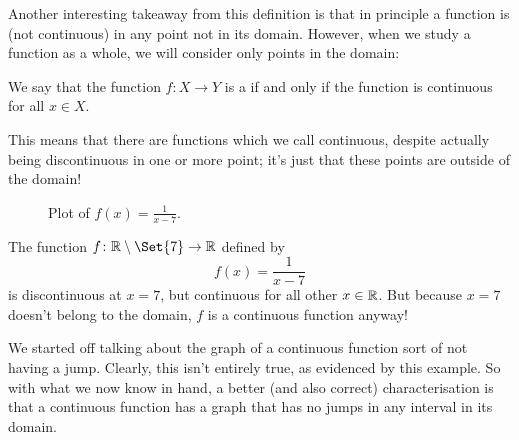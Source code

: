 \noindent
Another interesting takeaway from this definition is that in principle a function is  (not continuous) in any point not in its domain. However, when we study a function as a whole, we will consider only points in the domain:

\begin{definition}
	We say that the function $f \colon X \to Y$ is a  if and only if the function is continuous for all $x \in X$.
\end{definition}

\noindent
This means that there are functions which we call continuous, despite actually being discontinuous in one or more point; it's just that these points are outside of the domain!

\begin{figure}
	\centering
	\caption{Plot of $\displaystyle f(x) = \frac{1}{x - 7}$.}
\end{figure}

\begin{example}
	The function $f \colon \R \setminus \Set{7} \to \R$ defined by
	\[
		f(x) = \frac{1}{x - 7}
	\]
	is discontinuous at $x = 7$, but continuous for all other $x \in \mathbb{R}$.
	But because $x = 7$ doesn't belong to the domain, $f$ is a continuous function anyway!
\end{example}

\noindent
We started off talking about the graph of a continuous function sort of not having a jump.
Clearly, this isn't entirely true, as evidenced by this example.
So with what we now know in hand, a better (and also correct) characterisation is that a continuous function has a graph that has no jumps in any interval in its domain.

